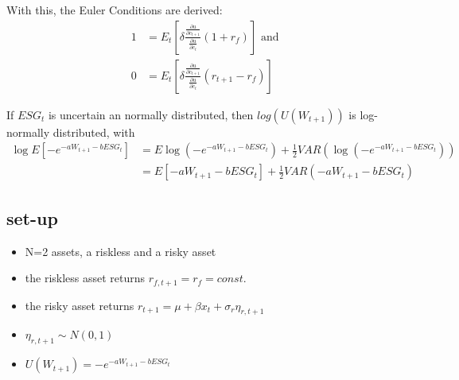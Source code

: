 \documentclass[]{article}
\begin{document}
With this, the Euler Conditions are derived:
\begin{align*}
	1 &= E_t \left[\delta \frac{\frac{\partial u}{\partial c_{t+1}}}{\frac{\partial u}{\partial c_t}}(1+r_f)\right] \text{ and } \\
	0 &= E_t \left[\delta \frac{\frac{\partial u}{\partial c_{t+1}}}{\frac{\partial u}{\partial c_t}}(r_{t+1} - r_f)\right]
\end{align*}

If $ESG_t$ is uncertain an normally distributed, then $log(U(W_{t+1}))$ is log-normally distributed, with
\begin{align*}
	\log E \left[-e^{-aW_{t+1} - bESG_t}\right] &= E \log(-e^{-aW_{t+1} - bESG_t}) + \frac{1}{2}VAR(\log(-e^{-aW_{t+1} - bESG_t}))\\
	&= E \left[-aW_{t+1} - bESG_t\right] + \frac{1}{2}VAR(-aW_{t+1} - bESG_t)
\end{align*}

\subsection{set-up}
\begin{itemize}
	\item N=2 assets, a riskless and a risky asset
	\item the riskless asset returns $r_{f, t+1} = r_f = const.$
	\item the risky asset returns $r_{t+1} = \mu + \beta x_t + \sigma_r \eta_{r, t+1}$
	\item $\eta_{r, t+1} \sim N(0,1)$
	\item  $U(W_{t+1}) = -e^{-aW_{t+1}-bESG_t}$
\end{itemize}
\end{document}
